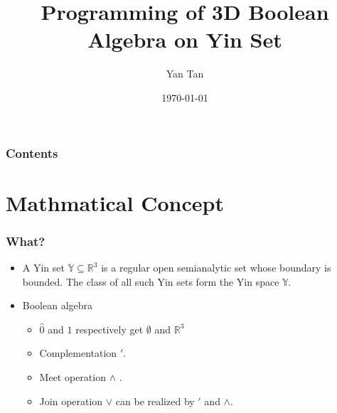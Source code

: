 \documentclass{beamer}
\begin{document}
\title{Programming of 3D Boolean Algebra on Yin Set}
\author{Yan Tan}
\date{\today}
\maketitle

\begin{frame}
  \frametitle{Contents}
  \tableofcontents
\end{frame}

\section{Mathmatical Concept}

\begin{frame}
  \frametitle{What?}
  \begin{itemize}

    
  \item A Yin set  $\mathbb{Y} \subseteq \mathbb{R}^3$ is a \textcolor[rgb]{1,0,0}{regular open} \textcolor[rgb]{1,0,1}{semianalytic} set whose \textcolor[rgb]{0,0,1}{boundary is bounded}. The class of all such Yin sets form the Yin space $\mathbb{Y}$.
  \item   Boolean algebra
    \begin{itemize}
    \item $\widehat{0}$ and $\widehat{1}$ respectively get $ \emptyset$ and $\mathbb{R}^3$
    \item Complementation $\prime$.
    \item Meet operation $\wedge$ .
    \item Join operation $\vee$ can be realized by $\prime$ and $\wedge$.
    
    \end{itemize}
  \end{itemize}
     \begin{figure}[h]
      \centering
    \end{figure}
\end{frame}

\end{document}
